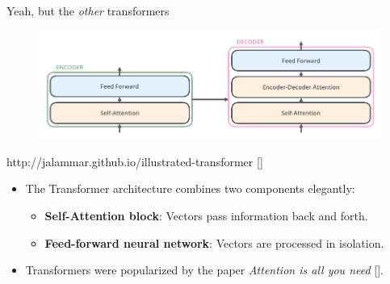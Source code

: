 \documentclass[10pt]{beamer}
\newcommand{\credit}[1]{{\par \raggedleft \scriptsize \mdseries \color{mDarkBrown} #1 \par}}
\newcommand{\citeme}[1]{{\xspace\color{scAqua} \scriptsize [\cite{#1}]}}
\newcommand{\feature}[1]{{\color{scLime} \textbf{#1}}}
\begin{document}
\begin{frame}{Yeah, but the \emph{other} transformers}
	\begin{figure}
		\includegraphics[width=\textwidth]{figures/Transformer_decoder.png}
	\end{figure}
	\credit{http://jalammar.github.io/illustrated-transformer \citeme{Alammar2018}}
	\begin{itemize}
		\item The Transformer architecture combines two components elegantly:
		\begin{itemize}
			\item \feature{Self-Attention block}: Vectors pass information back and forth.
			\item \feature{Feed-forward neural network}: Vectors are processed in isolation.
		\end{itemize}
	\item Transformers were popularized by the paper \emph{Attention is all you need}\citeme{Vaswani2017}.
	\end{itemize}
\end{frame}
\end{document}
